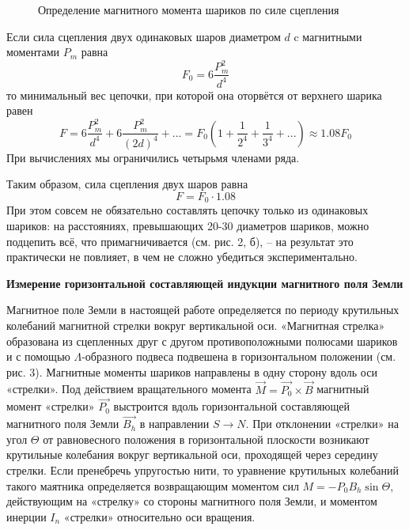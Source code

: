 \documentclass[14pt]{article}
\begin{document}
\begin{figure}[h!]
	\caption{Определение магнитного момента шариков по силе сцепления}
	\label{fig:image}
\end{figure}

Если сила сцепления двух одинаковых шаров диаметром $d$ c магнитными моментами $P_m$ равна
$$
	F_0 = 6\frac{P_m^2}{d^4}
$$
то минимальный вес цепочки, при которой она оторвётся от верхнего шарика равен
$$
	F = 6\frac{P_m^2}{d^4} + 6\frac{P_m^2}{(2d)^4} + ... = F_0(1 + \frac{1}{2^4} + \frac{1}{3^4} + ...) \approx 1.08 F_0
$$
При вычислениях мы ограничились четырьмя членами ряда.

Таким образом, сила сцепления двух шаров равна
$$
	F = F_0\cdot1.08
$$
При этом совсем не обязательно составлять цепочку только из одинаковых шариков: на расстояниях, превышающих 20-30 диаметров шариков, можно подцепить всё, что примагничивается (см. рис. 2, б), -- на результат это практически не повлияет, в чем не сложно убедиться экспериментально.

\vspace{1cm}
\textbf{Измерение горизонтальной составляющей индукции магнитного поля Земли}

Магнитное поле Земли в настоящей работе определяется по периоду крутильных колебаний магнитной стрелки вокруг вертикальной оси. «Магнитная стрелка» образована из сцепленных друг с другом противоположными полюсами шариков и с помощью $\Lambda$-образного подвеса подвешена в горизонтальном положении (см. рис. 3). Магнитные моменты шариков направлены в одну сторону вдоль оси «стрелки». Под действием вращательного момента $\vec{M} = \vec{P_0}\times\vec{B}$ магнитный момент «стрелки» $\vec{P_0}$ выстроится вдоль горизонтальной составляющей магнитного поля Земли $\vec{B_h}$ в направлении $S \rightarrow N$. При отклонении «стрелки» на угол $\Theta$ от равновесного положения в горизонтальной плоскости возникают крутильные колебания вокруг вертикальной оси, проходящей через середину стрелки. Если пренебречь упругостью нити, то уравнение крутильных колебаний такого маятника определяется возвращающим моментом сил $M = -P_0B_h\sin\Theta$, действующим на «стрелку» со стороны магнитного поля Земли, и моментом инерции 
$I_n$ «стрелки» относительно оси вращения.
\end{document}
